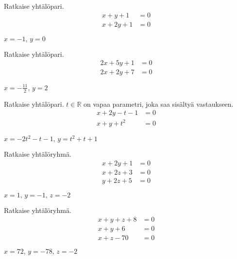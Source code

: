 \begin{tehtava}
    Ratkaise yhtälöpari.
    \begin{align*}
        x+y+1 &= 0 \\
        x+2y+1 &=0
    \end{align*}
    \begin{vastaus}
        $x = -1, \, y = 0$
    \end{vastaus}
\end{tehtava}

\begin{tehtava}
    Ratkaise yhtälöpari.
    \begin{align*}
        2x+5y+1 &= 0 \\
        2x+2y+7 &=0
    \end{align*}
    \begin{vastaus}
        $x = -\frac{11}{2}, \, y = 2$
    \end{vastaus}
\end{tehtava}

\begin{tehtava}
    Ratkaise yhtälöpari. $t \in \mathbb{R}$ on vapaa parametri, joka saa sisältyä vastaukseen.
    \begin{align*}
        x+2y-t-1 &= 0 \\
        x+y+t^2 &=0
    \end{align*}
    \begin{vastaus}
        $x = -2t^2-t-1, \, y = t^2+t+1$
    \end{vastaus}
\end{tehtava}

\begin{tehtava}
    Ratkaise yhtälöryhmä.
    \begin{align*}
        x+2y+1 &= 0 \\
        x+2z+3 &=0 \\
        y+2z+5 &=0
    \end{align*}
    \begin{vastaus}
        $x = 1, \, y = -1, \, z = -2$
    \end{vastaus}
\end{tehtava}

\begin{tehtava}
    Ratkaise yhtälöryhmä.
    \begin{align*}
        x+y+z+8 &= 0 \\
        x+y+6 &=0 \\
        x+z-70 &=0
    \end{align*}
    \begin{vastaus}
        $x = 72, \, y = -78, \, z = -2$
    \end{vastaus}
\end{tehtava}

